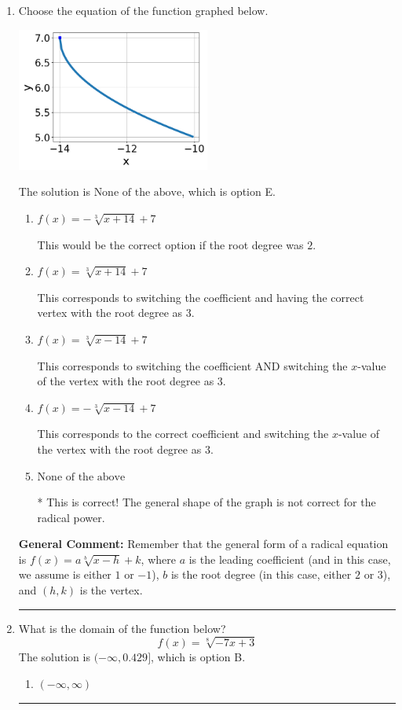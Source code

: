 \documentclass{extbook}[14pt]
\newcommand{\litem}[1]{\item #1

\rule{\textwidth}{0.4pt}}
\begin{document}
\begin{enumerate}\litem{
Choose the equation of the function graphed below.

\begin{center}
    \includegraphics[width=0.5\textwidth]{../Figures/radicalGraphToEquationCopyC.png}
\end{center}


The solution is \( \text{None of the above} \), which is option E.\begin{enumerate}[label=\Alph*.]
\item \( f(x) = - \sqrt[3]{x + 14} + 7 \)

This would be the correct option if the root degree was $2$.
\item \( f(x) = \sqrt[3]{x + 14} + 7 \)

This corresponds to switching the coefficient and having the correct vertex with the root degree as $3$.
\item \( f(x) = \sqrt[3]{x - 14} + 7 \)

This corresponds to switching the coefficient AND switching the $x$-value of the vertex with the root degree as $3$.
\item \( f(x) = - \sqrt[3]{x - 14} + 7 \)

This corresponds to the correct coefficient and switching the $x$-value of the vertex with the root degree as $3$.
\item \( \text{None of the above} \)

* This is correct! The general shape of the graph is not correct for the radical power.
\end{enumerate}

\textbf{General Comment:} Remember that the general form of a radical equation is $ f(x) = a \sqrt[b]{x - h} + k$, where $a$ is the leading coefficient (and in this case, we assume is either $1$ or $-1$), $b$ is the root degree (in this case, either $2$ or $3$), and $(h, k)$ is the vertex.
}
\litem{
What is the domain of the function below?
\[ f(x) = \sqrt[8]{-7 x + 3} \]The solution is \( (-\infty, 0.429] \), which is option B.\begin{enumerate}[label=\Alph*.]
\item \( (-\infty, \infty) \)


\end{enumerate}}
\end{enumerate}
\end{document}
